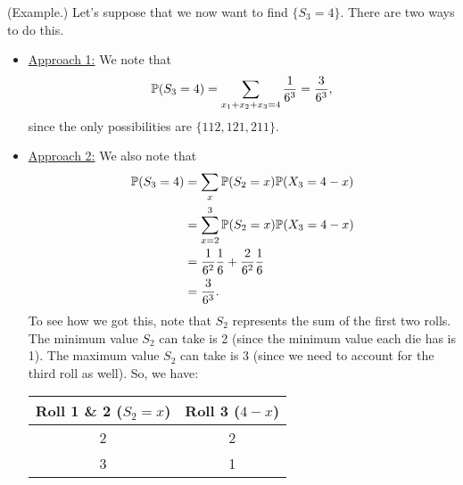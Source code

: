 \documentclass[letterpaper]{article}
\begin{document}
\begin{mdframed}[]
    (Example.) Let's suppose that we now want to find $\{S_3 = 4\}$. There are two ways to do this.
    \begin{itemize}
        \item \underline{Approach 1:} We note that 
        \[\mathbb{P}(S_3 = 4) = \sum_{x_1 + x_2 + x_3 = 4} \frac{1}{6^3} = \frac{3}{6^3},\]
        since the only possibilities are $\{112, 121, 211\}$.

        \item \underline{Approach 2:} We also note that 
        \begin{equation*}
            \begin{aligned}
                \mathbb{P}(S_3 = 4) &= \sum_{x} \mathbb{P}(S_2 = x) \mathbb{P}(X_3 = 4 - x) \\ 
                    &= \sum_{x = 2}^{3} \mathbb{P}(S_2 = x) \mathbb{P}(X_3 = 4 - x) \\ 
                    &= \frac{1}{6^2} \frac{1}{6} + \frac{2}{6^2} \frac{1}{6} \\ 
                    &= \frac{3}{6^3}.
            \end{aligned}
        \end{equation*}
        To see how we got this, note that $S_2$ represents the sum of the first two rolls. The minimum value $S_2$ can take is 2 (since the minimum value each die has is 1). The maximum value $S_2$ can take is 3 (since we need to account for the third roll as well). So, we have: 
        \begin{center}
            \begin{tabular}{||c|c||}
                \hline 
                Roll 1 \& 2 ($S_2 = x$) & Roll 3 ($4 - x$) \\ 
                \hline \hline 
                2 & 2 \\ 
                3 & 1 \\ 
                \hline 
            \end{tabular}
        \end{center}
    \end{itemize}
\end{mdframed}
\end{document}
